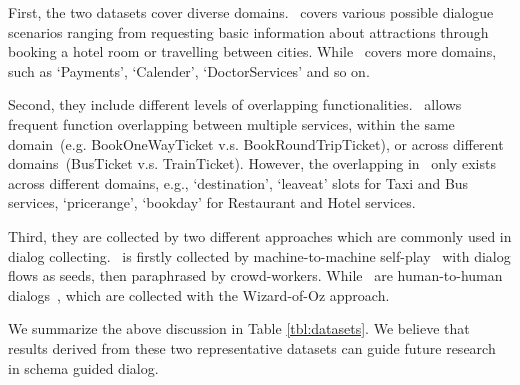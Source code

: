 First, the two datasets cover diverse domains. \multiwoz~covers
various possible dialogue scenarios ranging from requesting basic
information about attractions through booking a hotel room or
travelling between cities. While \sgdst~covers more domains, such as
`Payments', `Calender', `DoctorServices' and so on.

Second, they include different levels of overlapping
functionalities. \sgdst~allows frequent function overlapping between
multiple services, within the same domain~(e.g. BookOneWayTicket
v.s. BookRoundTripTicket), or across different domains~(BusTicket
v.s. TrainTicket). However, the overlapping in \multiwoz~only exists
across different domains, e.g., `destination', `leaveat' slots for
Taxi and Bus services, `pricerange', `bookday' for Restaurant and
Hotel services.

Third, they are collected by two different approaches which are
commonly used in dialog collecting. \sgdst~is firstly collected by
machine-to-machine self-play~\cite[M2M,][]{shah2018building} with
dialog flows as seeds, then paraphrased by crowd-workers. While
\multiwoz~are human-to-human
dialogs~\cite[H2H,][]{kelley1984iterative}, which are collected with
the Wizard-of-Oz approach.

We summarize the above discussion in Table \ref{tbl:datasets}.  We
believe that results derived from these two representative datasets can
guide future research in schema guided dialog.

